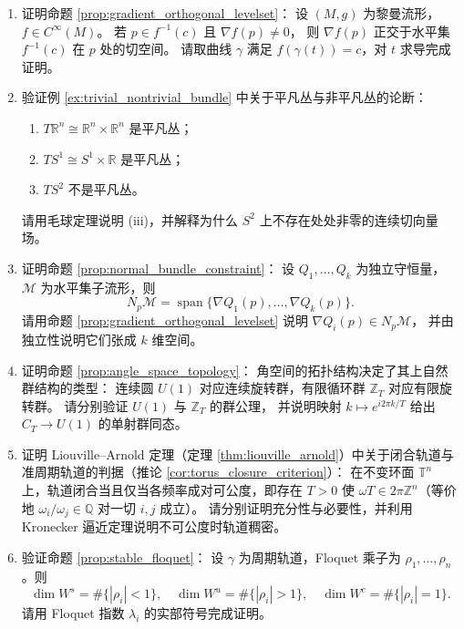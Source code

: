\begin{enumerate}[leftmargin=3em, label=\textbf{题 \arabic*}]
    \item 证明命题 \ref{prop:gradient_orthogonal_levelset}：
    设 $(M,g)$ 为黎曼流形，$f\in C^\infty(M)$。
    若 $p\in f^{-1}(c)$ 且 $\nabla f(p)\neq0$，
    则 $\nabla f(p)$ 正交于水平集 $f^{-1}(c)$ 在 $p$ 处的切空间。
    请取曲线 $\gamma$ 满足 $f(\gamma(t))=c$，对 $t$ 求导完成证明。

    \item 验证例 \ref{ex:trivial_nontrivial_bundle} 中关于平凡丛与非平凡丛的论断：
    \begin{enumerate}[label=(\roman*)]
        \item $T\mathbb{R}^n\cong\mathbb{R}^n\times\mathbb{R}^n$ 是平凡丛；
        \item $TS^1\cong S^1\times\mathbb{R}$ 是平凡丛；
        \item $TS^2$ 不是平凡丛。
    \end{enumerate}
    请用毛球定理说明 (iii)，并解释为什么 $S^2$ 上不存在处处非零的连续切向量场。

    \item 证明命题 \ref{prop:normal_bundle_constraint}：
    设 $Q_1,\dots,Q_k$ 为独立守恒量，$\mathcal{M}$ 为水平集子流形，则
    \[
    N_p\mathcal{M}=\operatorname{span}\{\nabla Q_1(p),\dots,\nabla Q_k(p)\}.
    \]
    请用命题 \ref{prop:gradient_orthogonal_levelset} 说明 $\nabla Q_i(p)\in N_p\mathcal{M}$，
    并由独立性说明它们张成 $k$ 维空间。

    \item 证明命题 \ref{prop:angle_space_topology}：
    角空间的拓扑结构决定了其上自然群结构的类型：
    连续圆 $U(1)$ 对应连续旋转群，有限循环群 $\mathbb{Z}_T$ 对应有限旋转群。
    请分别验证 $U(1)$ 与 $\mathbb{Z}_T$ 的群公理，
    并说明映射 $k\mapsto e^{i2\pi k/T}$ 给出 $C_T\to U(1)$ 的单射群同态。

    \item 证明 Liouville--Arnold 定理（定理 \ref{thm:liouville_arnold}）中关于闭合轨道与准周期轨道的判据（推论 \ref{cor:torus_closure_criterion}）：
    在不变环面 $\mathbb{T}^n$ 上，轨道闭合当且仅当各频率成对可公度，即存在 $T>0$ 使 $\omega T\in2\pi\mathbb{Z}^n$（等价地 $\omega_i/\omega_j\in\mathbb{Q}$ 对一切 $i,j$ 成立）。
    请分别证明充分性与必要性，并利用 Kronecker 逼近定理说明不可公度时轨道稠密。

    \item 验证命题 \ref{prop:stable_floquet}：
    设 $\gamma$ 为周期轨道，Floquet 乘子为 $\rho_1,\dots,\rho_n$。则
    \[
    \dim W^s=\#\{|\rho_i|<1\},\quad
    \dim W^u=\#\{|\rho_i|>1\},\quad
    \dim W^c=\#\{|\rho_i|=1\}.
    \]
    请用 Floquet 指数 $\lambda_i$ 的实部符号完成证明。


\end{enumerate}
